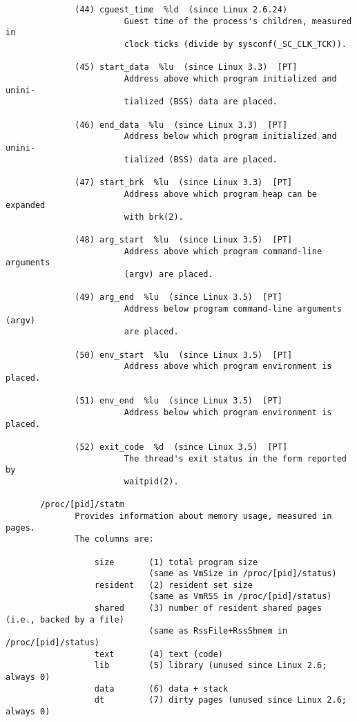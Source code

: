 \documentclass[]{article}
\begin{document}
\begin{verbatim}
              (44) cguest_time  %ld  (since Linux 2.6.24)
                        Guest time of the process's children, measured in
                        clock ticks (divide by sysconf(_SC_CLK_TCK)).

              (45) start_data  %lu  (since Linux 3.3)  [PT]
                        Address above which program initialized and unini‐
                        tialized (BSS) data are placed.

              (46) end_data  %lu  (since Linux 3.3)  [PT]
                        Address below which program initialized and unini‐
                        tialized (BSS) data are placed.

              (47) start_brk  %lu  (since Linux 3.3)  [PT]
                        Address above which program heap can be expanded
                        with brk(2).

              (48) arg_start  %lu  (since Linux 3.5)  [PT]
                        Address above which program command-line arguments
                        (argv) are placed.

              (49) arg_end  %lu  (since Linux 3.5)  [PT]
                        Address below program command-line arguments (argv)
                        are placed.

              (50) env_start  %lu  (since Linux 3.5)  [PT]
                        Address above which program environment is placed.

              (51) env_end  %lu  (since Linux 3.5)  [PT]
                        Address below which program environment is placed.

              (52) exit_code  %d  (since Linux 3.5)  [PT]
                        The thread's exit status in the form reported by
                        waitpid(2).

       /proc/[pid]/statm
              Provides information about memory usage, measured in pages.
              The columns are:

                  size       (1) total program size
                             (same as VmSize in /proc/[pid]/status)
                  resident   (2) resident set size
                             (same as VmRSS in /proc/[pid]/status)
                  shared     (3) number of resident shared pages (i.e., backed by a file)
                             (same as RssFile+RssShmem in /proc/[pid]/status)
                  text       (4) text (code)
                  lib        (5) library (unused since Linux 2.6; always 0)
                  data       (6) data + stack
                  dt         (7) dirty pages (unused since Linux 2.6; always 0)


\end{verbatim}
\end{document}
